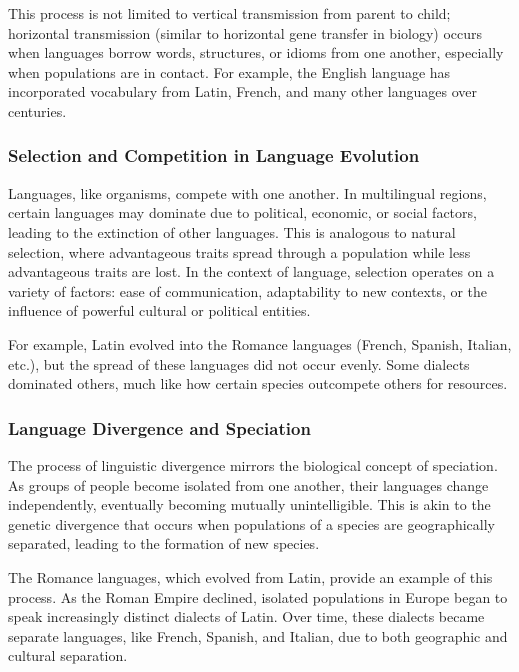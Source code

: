 \documentclass[10pt,a4paper]{scrbook}
\begin{document}
This process is not limited to vertical transmission from parent to child; horizontal transmission (similar to horizontal gene transfer in biology) occurs when languages borrow words, structures, or idioms from one another, especially when populations are in contact. For example, the English language has incorporated vocabulary from Latin, French, and many other languages over centuries.

\subsubsection{Selection and Competition in Language Evolution}

Languages, like organisms, compete with one another. In multilingual regions, certain languages may dominate due to political, economic, or social factors, leading to the extinction of other languages. This is analogous to natural selection, where advantageous traits spread through a population while less advantageous traits are lost. In the context of language, selection operates on a variety of factors: ease of communication, adaptability to new contexts, or the influence of powerful cultural or political entities.

For example, Latin evolved into the Romance languages (French, Spanish, Italian, etc.), but the spread of these languages did not occur evenly. Some dialects dominated others, much like how certain species outcompete others for resources.

\subsubsection{Language Divergence and Speciation}

The process of linguistic divergence mirrors the biological concept of speciation. As groups of people become isolated from one another, their languages change independently, eventually becoming mutually unintelligible. This is akin to the genetic divergence that occurs when populations of a species are geographically separated, leading to the formation of new species.

The Romance languages, which evolved from Latin, provide an example of this process. As the Roman Empire declined, isolated populations in Europe began to speak increasingly distinct dialects of Latin. Over time, these dialects became separate languages, like French, Spanish, and Italian, due to both geographic and cultural separation.
\end{document}
